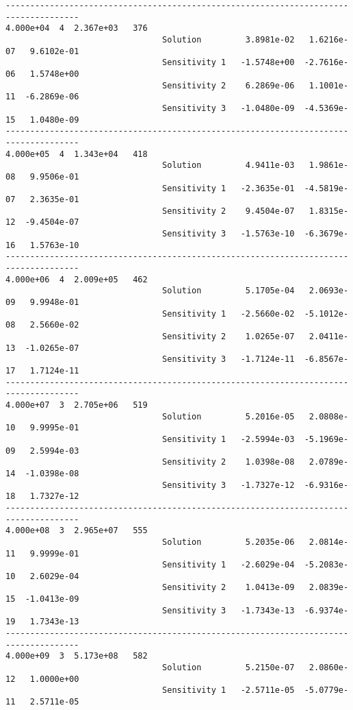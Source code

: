 \begin{verbatim}
-------------------------------------------------------------------------------------
4.000e+04  4  2.367e+03   376
                                Solution         3.8981e-02   1.6216e-07   9.6102e-01 
                                Sensitivity 1   -1.5748e+00  -2.7616e-06   1.5748e+00 
                                Sensitivity 2    6.2869e-06   1.1001e-11  -6.2869e-06 
                                Sensitivity 3   -1.0480e-09  -4.5369e-15   1.0480e-09 
-------------------------------------------------------------------------------------
4.000e+05  4  1.343e+04   418
                                Solution         4.9411e-03   1.9861e-08   9.9506e-01 
                                Sensitivity 1   -2.3635e-01  -4.5819e-07   2.3635e-01 
                                Sensitivity 2    9.4504e-07   1.8315e-12  -9.4504e-07 
                                Sensitivity 3   -1.5763e-10  -6.3679e-16   1.5763e-10 
-------------------------------------------------------------------------------------
4.000e+06  4  2.009e+05   462
                                Solution         5.1705e-04   2.0693e-09   9.9948e-01 
                                Sensitivity 1   -2.5660e-02  -5.1012e-08   2.5660e-02 
                                Sensitivity 2    1.0265e-07   2.0411e-13  -1.0265e-07 
                                Sensitivity 3   -1.7124e-11  -6.8567e-17   1.7124e-11 
-------------------------------------------------------------------------------------
4.000e+07  3  2.705e+06   519
                                Solution         5.2016e-05   2.0808e-10   9.9995e-01 
                                Sensitivity 1   -2.5994e-03  -5.1969e-09   2.5994e-03 
                                Sensitivity 2    1.0398e-08   2.0789e-14  -1.0398e-08 
                                Sensitivity 3   -1.7327e-12  -6.9316e-18   1.7327e-12 
-------------------------------------------------------------------------------------
4.000e+08  3  2.965e+07   555
                                Solution         5.2035e-06   2.0814e-11   9.9999e-01 
                                Sensitivity 1   -2.6029e-04  -5.2083e-10   2.6029e-04 
                                Sensitivity 2    1.0413e-09   2.0839e-15  -1.0413e-09 
                                Sensitivity 3   -1.7343e-13  -6.9374e-19   1.7343e-13 
-------------------------------------------------------------------------------------
4.000e+09  3  5.173e+08   582
                                Solution         5.2150e-07   2.0860e-12   1.0000e+00 
                                Sensitivity 1   -2.5711e-05  -5.0779e-11   2.5711e-05 

\end{verbatim}
